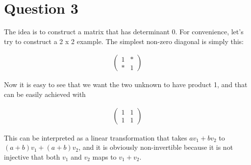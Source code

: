 \section*{Question 3}
The idea is to construct a matrix that has determinant 0. For convenience, let's try to construct a 2 x 2 example. The simplest non-zero diagonal is simply this:

\begin{eqnarray*}
\left(\begin{array}{cc}
1 & * \\
* & 1
\end{array}\right)
\end{eqnarray*}

Now it is easy to see that we want the two unknown to have product 1, and that can be easily achieved with 

\begin{eqnarray*}
\left(\begin{array}{cc}
1 & 1 \\
1 & 1
\end{array}\right)
\end{eqnarray*}

This can be interpreted as a linear transformation that takes $ av_1 + bv_2 $ to $ (a+b)v_1 + (a+b)v_2 $, and it is obviously non-invertible because it is not injective that both $ v_1 $ and $ v_2 $ maps to $ v_1 + v_2 $.